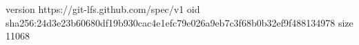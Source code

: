 version https://git-lfs.github.com/spec/v1
oid sha256:24d3e23b60680df19b930cac4e1efc79e026a9eb7c3f68b0b32ef9f488134978
size 11068
